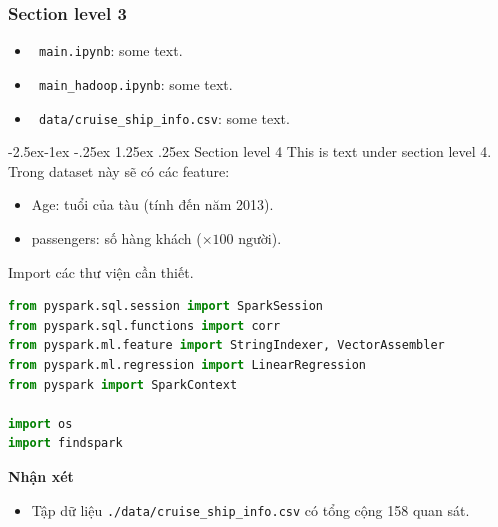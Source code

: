 \documentclass[12pt]{article}
\makeatletter
\renewcommand\paragraph{\@startsection{paragraph}{4}{\z@}%
            {-2.5ex\@plus -1ex \@minus -.25ex}%
            {1.25ex \@plus .25ex}%
            {\normalfont\normalsize\bfseries}}
\makeatother
\begin{document}
\vskip 0.5cm

\subsubsection{Section level 3}
\begin{flushleft}
  \begin{itemize}
    \setlength{\itemindent}{0.6cm}
    \item \texttt{\color{purple} main.ipynb}: some text.
    \item \texttt{\color{purple} main\_hadoop.ipynb}: some text.
    \item \texttt{\color{purple} data/cruise\_ship\_info.csv}: some text.
  \end{itemize}
\end{flushleft}
\paragraph{Section level 4}
This is text under section level 4.\\

\indent Trong dataset này sẽ có các feature:
\begin{itemize}
  \setlength{\itemindent}{0.6cm}
  \item \textsf{Age}: tuổi của tàu (tính đến năm 2013).
  \item \textsf{passengers}: số hàng khách ($\times 100 \text{ người}$).
\end{itemize}

\indent Import các thư viện cần thiết.
\begin{lstlisting}[language=python]
from pyspark.sql.session import SparkSession
from pyspark.sql.functions import corr
from pyspark.ml.feature import StringIndexer, VectorAssembler
from pyspark.ml.regression import LinearRegression
from pyspark import SparkContext

import os
import findspark
\end{lstlisting}

\begin{tcolorbox}[grow to left by=-0.6cm]
  \textbf{Nhận xét}
  \begin{itemize}
    \item Tập dữ liệu \texttt{./data/cruise\_ship\_info.csv} có tổng cộng 158 quan sát.
  \end{itemize}
\end{tcolorbox}
\end{document}
